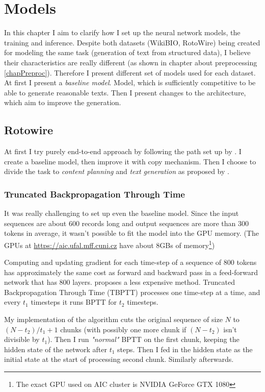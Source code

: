 \chapter{Models}
In this chapter I aim to clarify how I set up the neural network models, the training and inference. Despite both datasets (WikiBIO, RotoWire) being created for modeling the same task (generation of text from structured data), I believe their characteristics are really different (as shown in chapter about preprocessing \ref{chapPreproc}). Therefore I present different set of models used for each dataset. At first I present a \emph{baseline model}. Model, which is sufficiently competitive to be able to generate reasonable texts. Then I present changes to the architecture, which aim to improve the generation.

\section{Rotowire}

At first I try purely end-to-end approach by following the path set up by \citep{wiseman2017}. I create a baseline model, then improve it with copy mechanism. Then I choose to divide the task to \emph{content planning} and \emph{text generation} as proposed by \citep{puduppully2019datatotext}. 

\subsection{Truncated Backpropagation Through Time}

It was really challenging to set up even the baseline model. Since the input sequences are about 600 records long and output sequences are more than 300 tokens in average, it wasn't possible to fit the model into the GPU memory. (The GPUs at \url{https://aic.ufal.mff.cuni.cz} have about 8GBs of memory\footnote{The exact GPU used on AIC cluster is NVIDIA GeForce GTX 1080})

Computing and updating gradient for each time-step of a sequence of 800 tokens has approximately the same cost as forward and backward pass in a feed-forward network that has 800 layers. \citep{williamsTBPTT} proposes a less expensive method. Truncated Backpropagation Through Time (TBPTT) processes one time-step at a time, and every $t_1$ timesteps it runs BPTT for $t_2$ timesteps.

My implementation of the algorithm cuts the original sequence of size $N$ to $( N - t_2 ) / t_1 + 1$ chunks (with possibly one more chunk if $(N - t_2)$ isn't divisible by $t_1$). Then I run \emph{"normal"} BPTT on the first chunk, keeping the hidden state of the network after $t_1$ steps. Then I fed in the hidden state as the initial state at the start of processing second chunk. Similarly afterwards.


